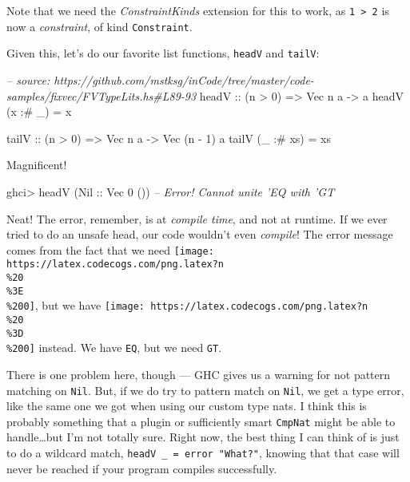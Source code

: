 \documentclass[]{article}
\newenvironment{Shaded}{\begin{snugshade}}{\end{snugshade}}
\newcommand{\CommentTok}[1]{\textcolor[rgb]{0.56,0.35,0.01}{\textit{#1}}}
\newcommand{\DataTypeTok}[1]{\textcolor[rgb]{0.13,0.29,0.53}{#1}}
\newcommand{\DecValTok}[1]{\textcolor[rgb]{0.00,0.00,0.81}{#1}}
\newcommand{\FunctionTok}[1]{\textcolor[rgb]{0.00,0.00,0.00}{#1}}
\newcommand{\NormalTok}[1]{#1}
\newcommand{\OtherTok}[1]{\textcolor[rgb]{0.56,0.35,0.01}{#1}}
\begin{document}
Note that we need the \emph{ConstraintKinds} extension for this to work, as
\texttt{1\ \textgreater{}\ 2} is now a \emph{constraint}, of kind
\texttt{Constraint}.

Given this, let's do our favorite list functions, \texttt{headV} and
\texttt{tailV}:

\begin{Shaded}
\begin{Highlighting}[]
\CommentTok{-- source: https://github.com/mstksg/inCode/tree/master/code-samples/fixvec/FVTypeLits.hs#L89-93}
\OtherTok{headV ::}\NormalTok{ (n }\FunctionTok{>} \DecValTok{0}\NormalTok{) }\OtherTok{=>} \DataTypeTok{Vec}\NormalTok{ n a }\OtherTok{->}\NormalTok{ a}
\NormalTok{headV (x }\FunctionTok{:#}\NormalTok{ _)  }\FunctionTok{=}\NormalTok{ x}

\OtherTok{tailV ::}\NormalTok{ (n }\FunctionTok{>} \DecValTok{0}\NormalTok{) }\OtherTok{=>} \DataTypeTok{Vec}\NormalTok{ n a }\OtherTok{->} \DataTypeTok{Vec}\NormalTok{ (n }\FunctionTok{-} \DecValTok{1}\NormalTok{) a}
\NormalTok{tailV (_ }\FunctionTok{:#}\NormalTok{ xs) }\FunctionTok{=}\NormalTok{ xs}
\end{Highlighting}
\end{Shaded}

Magnificent!

\begin{Shaded}
\begin{Highlighting}[]
\NormalTok{ghci}\FunctionTok{>}\NormalTok{ headV (}\DataTypeTok{Nil}\OtherTok{ ::} \DataTypeTok{Vec} \DecValTok{0}\NormalTok{ ())}
\CommentTok{-- Error!  Cannot unite 'EQ with 'GT}
\end{Highlighting}
\end{Shaded}

Neat! The error, remember, is at \emph{compile time}, and not at runtime. If we
ever tried to do an unsafe head, our code wouldn't even \emph{compile}! The
error message comes from the fact that we need
\texttt{[image: https://latex.codecogs.com/png.latex?n\\\%20\\\%3E\\\%200]}, but we
have \texttt{[image: https://latex.codecogs.com/png.latex?n\\\%20\\\%3D\\\%200]}
instead. We have \texttt{EQ}, but we need \texttt{GT}.

There is one problem here, though --- GHC gives us a warning for not pattern
matching on \texttt{Nil}. But, if we do try to pattern match on \texttt{Nil}, we
get a type error, like the same one we got when using our custom type nats. I
think this is probably something that a plugin or sufficiently smart
\texttt{CmpNat} might be able to handle\ldots{}but I'm not totally sure. Right
now, the best thing I can think of is just to do a wildcard match,
\texttt{headV\ \_\ =\ error\ "What?"}, knowing that that case will never be
reached if your program compiles successfully.
\end{document}
